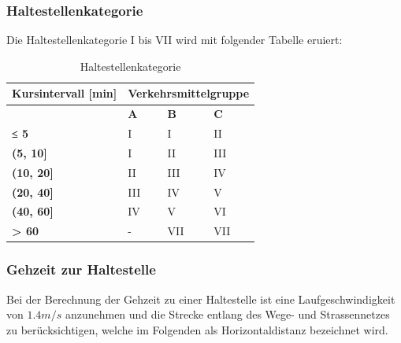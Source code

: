 \cleardoublepage
\subsubsection{Haltestellenkategorie}
\label{Berechnungsmethodik OeVGK18:Haltestellenkategorie}
Die Haltestellenkategorie I bis VII wird mit folgender Tabelle eruiert:

\begin{table}[H]
    \begin{tabular}[c]{l p{4.0cm} p{4.0cm} p{4.0cm}}
        \toprule
        \textbf{Kursintervall [min]}
                                & \multicolumn{3}{c}{\textbf{Verkehrsmittelgruppe}}\\
        \midrule
        \textbf{}
                                & \textbf{A}
                                & \textbf{B}
                                & \textbf{C}\\
        \textbf{≤ 5}
                                & I
                                & I
                                & II\\
        \textbf{(5, 10]}
                                & I
                                & II
                                & III\\
        \textbf{(10, 20]}
                                & II
                                & III
                                & IV\\
        \textbf{(20, 40]}
                                & III
                                & IV
                                & V\\
        \textbf{(40, 60]}
                                & IV
                                & V
                                & VI\\
        \textbf{> 60}
                                & -
                                & VII
                                & VII\\
        \bottomrule
    \end{tabular}
    \caption{Haltestellenkategorie}
    \label{Haltestellenkategorie}
\end{table}

\subsubsection{Gehzeit zur Haltestelle}
\label{Berechnungsmethodik OeVGK18:Gehzeit zur Haltestelle}
Bei der Berechnung der Gehzeit zu einer \gls{Haltestelle} ist eine Laufgeschwindigkeit von $1.4 m/s$ anzunehmen und die Strecke entlang des Wege- und Strassennetzes zu berücksichtigen, welche im Folgenden als Horizontaldistanz bezeichnet wird.

